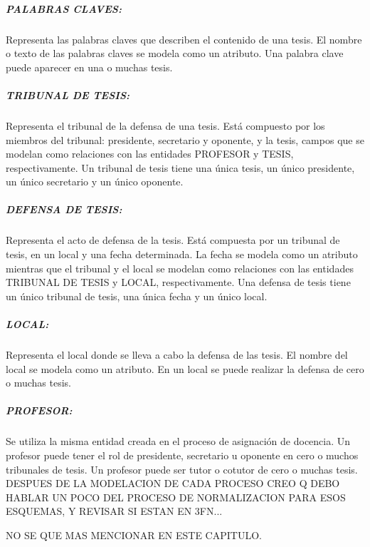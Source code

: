 \subparagraph{PALABRAS CLAVES:}
Representa las palabras claves que describen el contenido de una tesis.
El nombre o texto de las palabras claves se modela como un atributo. Una 
palabra clave puede aparecer en una o muchas tesis. 


\subparagraph{TRIBUNAL DE TESIS:}
Representa el tribunal de la defensa de una tesis.
Está compuesto por los miembros del tribunal: presidente, secretario y oponente, 
y la tesis, campos que se modelan como relaciones con las entidades PROFESOR y TESIS, respectivamente.
Un tribunal de tesis tiene una única tesis, un único presidente, un único secretario y 
un único oponente.


\subparagraph{DEFENSA DE TESIS:}
Representa el acto de defensa de la tesis. 
Está compuesta por un tribunal de tesis, en un local y una 
fecha determinada. La fecha se modela como un atributo mientras que 
el tribunal y el local se modelan como relaciones con las entidades TRIBUNAL DE 
TESIS y LOCAL, respectivamente. Una defensa de tesis tiene un único tribunal de tesis,
una única fecha y un único local.



\subparagraph{LOCAL:}
Representa el local donde se lleva a cabo la defensa de las tesis.
El nombre del local se modela como un atributo. 
En un local se puede realizar la defensa de cero o muchas tesis.


\subparagraph{PROFESOR:}
Se utiliza la misma entidad creada en el proceso de asignación de docencia.
Un profesor puede tener el rol de presidente, secretario u oponente en cero o 
muchos tribunales de tesis. Un profesor puede ser 
tutor o cotutor de cero o muchas tesis. \\


DESPUES DE LA MODELACION DE CADA PROCESO CREO Q DEBO HABLAR UN 
POCO DEL PROCESO DE NORMALIZACION PARA ESOS ESQUEMAS, Y REVISAR SI 
ESTAN EN 3FN... 

NO SE QUE MAS MENCIONAR EN ESTE CAPITULO.


